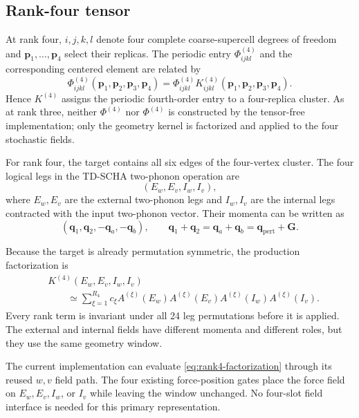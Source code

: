 \documentclass{article}
\begin{document}
\subsection{Rank-four tensor}
\label{sec:rank4}

At rank four, $i,j,k,l$ denote four complete coarse-supercell degrees of
freedom and $\bm p_1,\ldots,\bm p_4$ select their replicas. The periodic
entry $\Phi^{(4)}_{ijkl}$ and the corresponding centered element are related
by
\begin{equation}
    \varPhi^{(4)}_{ijkl}
    (\bm p_1,\bm p_2,\bm p_3,\bm p_4)
    =
    \Phi^{(4)}_{ijkl}
    K^{(4)}_{ijkl}
    (\bm p_1,\bm p_2,\bm p_3,\bm p_4).
    \label{eq:rank4-extension}
\end{equation}
Hence $K^{(4)}$ assigns the periodic fourth-order entry to a four-replica
cluster. As at rank three, neither $\Phi^{(4)}$ nor $\varPhi^{(4)}$ is
constructed by the tensor-free implementation; only the geometry kernel is
factorized and applied to the four stochastic fields.

For rank four, the target contains all six edges of the four-vertex
cluster. The four logical legs in the TD-SCHA two-phonon operation are
\begin{equation}
    (E_w,E_v,I_w,I_v),
    \label{eq:d4-legs}
\end{equation}
where $E_w,E_v$ are the external two-phonon legs and $I_w,I_v$ are the
internal legs contracted with the input two-phonon vector. Their momenta
can be written as
\begin{equation}
    (\bm q_1,\bm q_2,-\bm q_a,-\bm q_b),
    \qquad
    \bm q_1+\bm q_2
    =
    \bm q_a+\bm q_b
    =
    \bm q_{\text{pert}}+\bm G.
    \label{eq:d4-momenta}
\end{equation}

Because the target is already permutation symmetric, the production
factorization is
\begin{align}
    &K^{(4)}(E_w,E_v,I_w,I_v) \nonumber\\
    &\qquad\simeq
    \sum_{\xi=1}^{R_4}c_\xi
    A^{(\xi)}(E_w)
    A^{(\xi)}(E_v)
    A^{(\xi)}(I_w)
    A^{(\xi)}(I_v).
    \label{eq:rank4-factorization}
\end{align}
Every rank term is invariant under all 24 leg permutations before it is
applied. The external and internal fields have different momenta and
different roles, but they use the same geometry window.

The current implementation can evaluate
\autoref{eq:rank4-factorization} through its reused $w,v$ field path. The
four existing force-position gates place the force field on $E_w,E_v,I_w$,
or $I_v$ while leaving the window unchanged. No four-slot field interface
is needed for this primary representation.
\end{document}
